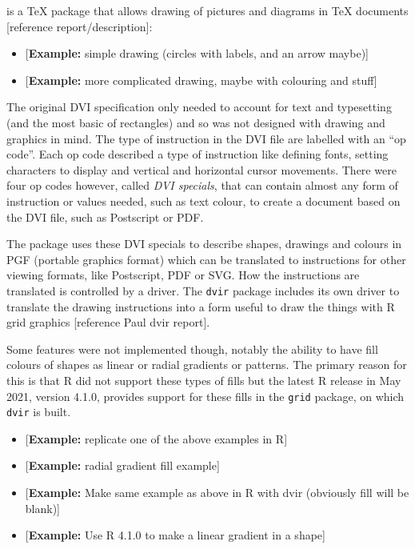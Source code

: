 \documentclass[]{article}
\begin{document}
\Tikz{} is a \TeX{} package that allows drawing of pictures and diagrams
in \TeX{} documents {[}reference \Tikz{} report/description{]}:

\begin{itemize}
\item
  {[}\textbf{Example:} simple \Tikz{} drawing (circles with labels, and
  an arrow maybe){]}
\item
  {[}\textbf{Example:} more complicated \Tikz{} drawing, maybe with
  colouring and stuff{]}
\end{itemize}

The original DVI specification only needed to account for text and
typesetting (and the most basic of rectangles) and so was not designed
with drawing and graphics in mind. The type of instruction in the DVI
file are labelled with an ``op code''. Each op code described a type of
instruction like defining fonts, setting characters to display and
vertical and horizontal cursor movements. There were four op codes
however, called \emph{DVI specials}, that can contain almost any form of
instruction or values needed, such as text colour, to create a document
based on the DVI file, such as Postscript or PDF.

The \Tikz{} package uses these DVI specials to describe shapes, drawings
and colours in PGF (portable graphics format) which can be translated to
instructions for other viewing formats, like Postscript, PDF or SVG. How
the instructions are translated is controlled by a \Tikz{} driver. The
\texttt{dvir} package includes its own \Tikz{} driver to translate the
drawing instructions into a form useful to draw the things with R grid
graphics {[}reference Paul dvir \Tikz{} report{]}.

Some \Tikz{} features were not implemented though, notably the ability
to have fill colours of shapes as linear or radial gradients or
patterns. The primary reason for this is that R did not support these
types of fills but the latest R release in May 2021, version 4.1.0,
provides support for these fills in the \texttt{grid} package, on which
\texttt{dvir} is built.

\begin{itemize}
\item
  {[}\textbf{Example:} replicate one of the above examples in R{]}
\item
  {[}\textbf{Example:} \Tikz{} radial gradient fill example{]}
\item
  {[}\textbf{Example:} Make same \Tikz{} example as above in R with dvir
  (obviously fill will be blank){]}
\item
  {[}\textbf{Example:} Use R 4.1.0 to make a linear gradient in a
  shape{]}
\end{itemize}
\end{document}

